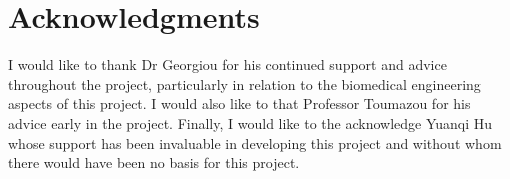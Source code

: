 \renewcommand{\baselinestretch}{1.5}
\chapter{Acknowledgments}
\renewcommand{\baselinestretch}{\mystretch}

\onehalfspacing
I would like to thank Dr Georgiou for his continued support and advice throughout the project, particularly in relation to the biomedical engineering aspects of this project. I would also like to that Professor Toumazou for his advice early in the project. Finally, I would like to the acknowledge Yuanqi Hu whose support has been invaluable in developing this project and without whom there would have been no basis for this project.